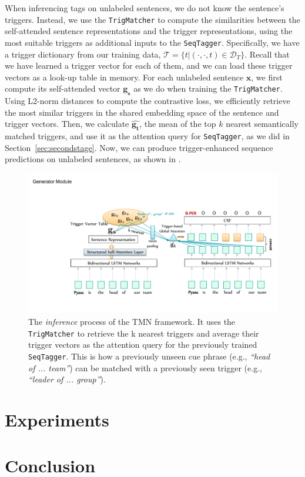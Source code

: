 When inferencing tags on unlabeled sentences,
we do not know the sentence's triggers.
Instead, we use the \texttt{TrigMatcher} to compute the similarities between the self-attended sentence representations and the trigger representations, using the most suitable triggers as additional inputs to the \texttt{SeqTagger}.
Specifically, we have a trigger dictionary from our training data, $\mathcal{T}=\{t | (\cdot, \cdot, t) \in \mathcal{D}_T\}$.
Recall that we have learned a trigger vector for each of them, and we can load these trigger vectors as a look-up table in memory.
For each unlabeled sentence $\mathbf{x}$, we first compute its self-attended vector $\mathbf{g_s}$ as we do when training the \texttt{TrigMatcher}.
Using L2-norm distances to compute the contrastive loss, we efficiently retrieve the most similar triggers in the shared embedding space of the sentence and trigger vectors.
Then, we calculate $\hat{\mathbf{g_t}}$, the mean of the top $k$ nearest semantically matched triggers, and use it as the attention query for \texttt{SeqTagger}, as we did in Section~\ref{sec:secondstage}.
Now, we can produce trigger-enhanced sequence predictions on unlabeled sentences, as shown in .

\begin{figure}[h]
 	\centering 
	\includegraphics[width=0.85\linewidth]{LatexDiss/figures/inference.pdf}
	\caption{The \textit{inference} process of the TMN framework. It uses the \texttt{TrigMatcher} to retrieve the k nearest triggers and average their trigger vectors as the attention query for the previously trained \texttt{SeqTagger}. This is how a previously unseen cue phrase (e.g., \textit{``head of ... team''}) can be matched with a previously seen trigger (e.g., \textit{``leader of ... group''}).} 
	\label{fig:inference}
\end{figure}

\section{Experiments}
\label{sec:exp}

\section{Conclusion}